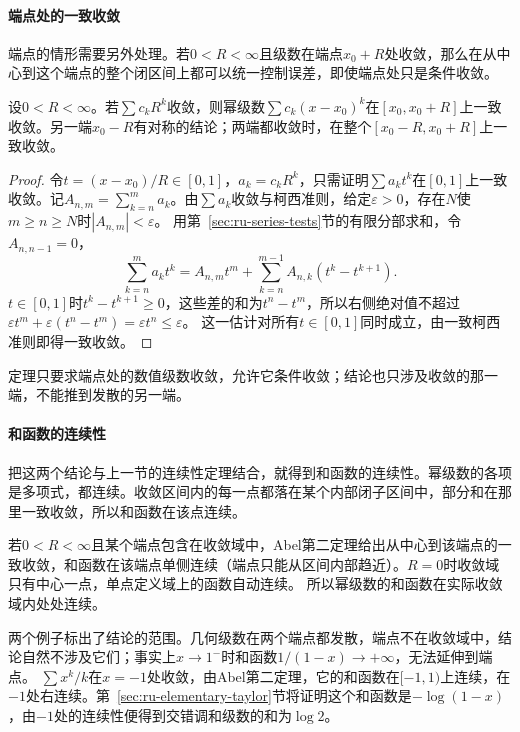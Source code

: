\paragraph{端点处的一致收敛}
端点的情形需要另外处理。若$0<R<\infty$且级数在端点$x_0+R$处收敛，那么在从中心到这个端点的整个闭区间上都可以统一控制误差，即使端点处只是条件收敛。
\begin{theorem}[Abel第二定理]
\label{thm:ru-abel-endpoint}
设$0<R<\infty$。若$\sum c_kR^k$收敛，则幂级数$\sum c_k(x-x_0)^k$在$[x_0,x_0+R]$上一致收敛。另一端$x_0-R$有对称的结论；两端都收敛时，在整个$[x_0-R,x_0+R]$上一致收敛。
\end{theorem}
\begin{proof}
令$t=(x-x_0)/R\in[0,1]$，$a_k=c_kR^k$，只需证明$\sum a_kt^k$在$[0,1]$上一致收敛。记$A_{n,m}=\sum_{k=n}^ma_k$。由$\sum a_k$收敛与柯西准则，给定$\varepsilon>0$，存在$N$使$m\geq n\geq N$时$|A_{n,m}|<\varepsilon$。
用第~\ref{sec:ru-series-tests}节的有限分部求和，令$A_{n,n-1}=0$，
\[
 \sum_{k=n}^ma_kt^k=A_{n,m}t^m+\sum_{k=n}^{m-1}A_{n,k}(t^k-t^{k+1}).
\]
$t\in[0,1]$时$t^k-t^{k+1}\geq0$，这些差的和为$t^n-t^m$，所以右侧绝对值不超过$\varepsilon t^m+\varepsilon(t^n-t^m)=\varepsilon t^n\leq\varepsilon$。
这一估计对所有$t\in[0,1]$同时成立，由一致柯西准则即得一致收敛。
\end{proof}
定理只要求端点处的数值级数收敛，允许它条件收敛；结论也只涉及收敛的那一端，不能推到发散的另一端。

\paragraph{和函数的连续性}
把这两个结论与上一节的连续性定理结合，就得到和函数的连续性。幂级数的各项是多项式，都连续。收敛区间内的每一点都落在某个内部闭子区间中，部分和在那里一致收敛，所以和函数在该点连续。

若$0<R<\infty$且某个端点包含在收敛域中，Abel第二定理给出从中心到该端点的一致收敛，和函数在该端点单侧连续（端点只能从区间内部趋近）。$R=0$时收敛域只有中心一点，单点定义域上的函数自动连续。
所以幂级数的和函数在实际收敛域内处处连续。

两个例子标出了结论的范围。几何级数在两个端点都发散，端点不在收敛域中，结论自然不涉及它们；事实上$x\to1^-$时和函数$1/(1-x)\to+\infty$，无法延伸到端点。
$\sum x^k/k$在$x=-1$处收敛，由Abel第二定理，它的和函数在$[-1,1)$上连续，在$-1$处右连续。第~\ref{sec:ru-elementary-taylor}节将证明这个和函数是$-\log(1-x)$，由$-1$处的连续性便得到交错调和级数的和为$\log2$。

